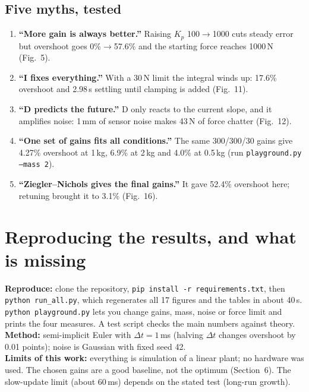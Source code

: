 \documentclass[10pt,a4paper]{article}
\begin{document}
\subsection{Five myths, tested}
\begin{enumerate}
\item \textbf{``More gain is always better.''} Raising $K_p$ 100$\to$1000 cuts steady error but overshoot goes 0\%$\to$57.6\% and the starting force reaches 1000\,N (Fig.~5).
\item \textbf{``I fixes everything.''} With a 30\,N limit the integral winds up: 17.6\% overshoot and 2.98\,s settling until clamping is added (Fig.~11).
\item \textbf{``D predicts the future.''} D only reacts to the current slope, and it amplifies noise: 1\,mm of sensor noise makes 43\,N of force chatter (Fig.~12).
\item \textbf{``One set of gains fits all conditions.''} The same 300/300/30 gains give 4.27\% overshoot at 1\,kg, 6.9\% at 2\,kg and 4.0\% at 0.5\,kg (run \texttt{playground.py --mass 2}).
\item \textbf{``Ziegler--Nichols gives the final gains.''} It gave 52.4\% overshoot here; retuning brought it to 3.1\% (Fig.~16).
\end{enumerate}

\section*{Reproducing the results, and what is missing}
\textbf{Reproduce:} clone the repository, \texttt{pip install -r requirements.txt}, then \texttt{python run\_all.py}, which regenerates all 17 figures and the tables in about 40\,s. \texttt{python playground.py} lets you change gains, mass, noise or force limit and prints the four measures. A test script checks the main numbers against theory.\\
\textbf{Method:} semi-implicit Euler with $\Delta t=1$\,ms (halving $\Delta t$ changes overshoot by 0.01 points); noise is Gaussian with fixed seed 42.\\
\textbf{Limits of this work:} everything is simulation of a linear plant; no hardware was used. The chosen gains are a good baseline, not the optimum (Section~6). The slow-update limit (about 60\,ms) depends on the stated test (long-run growth).
\end{document}
